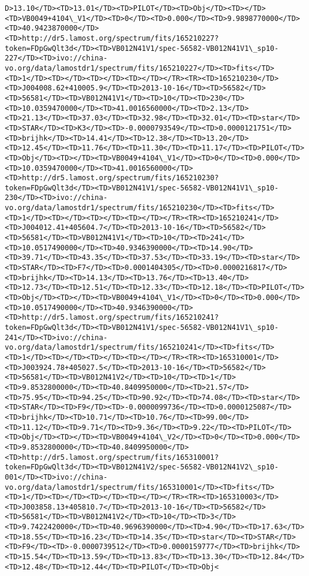 \documentclass[11pt]{article}
\begin{document}
\begin{Verbatim}[commandchars=\\\{\}]
D>13.10</TD><TD>13.01</TD><TD>PILOT</TD><TD>Obj</TD><TD></TD><TD>VB0049+4104\_V1</TD><TD>0</TD><TD>0.000</TD><TD>9.9898770000</TD><TD>40.9423870000</TD><TD>http://dr5.lamost.org/spectrum/fits/165210227?token=FDpGwQlt3d</TD><TD>VB012N41V1/spec-56582-VB012N41V1\_sp10-227</TD><TD>ivo://china-vo.org/data/lamostdr1/spectrum/fits/165210227</TD><TD>fits</TD><TD>1</TD><TD></TD><TD></TD><TD></TD></TR><TR><TD>165210230</TD><TD>J004008.62+410005.9</TD><TD>2013-10-16</TD><TD>56582</TD><TD>56581</TD><TD>VB012N41V1</TD><TD>10</TD><TD>230</TD><TD>10.0359470000</TD><TD>41.0016560000</TD><TD>2.13</TD><TD>21.13</TD><TD>37.03</TD><TD>32.98</TD><TD>32.01</TD><TD>star</TD><TD>STAR</TD><TD>K3</TD><TD>-0.0000793549</TD><TD>0.0000121751</TD><TD>brijhk</TD><TD>14.41</TD><TD>12.38</TD><TD>13.20</TD><TD>12.45</TD><TD>11.76</TD><TD>11.30</TD><TD>11.17</TD><TD>PILOT</TD><TD>Obj</TD><TD></TD><TD>VB0049+4104\_V1</TD><TD>0</TD><TD>0.000</TD><TD>10.0359470000</TD><TD>41.0016560000</TD><TD>http://dr5.lamost.org/spectrum/fits/165210230?token=FDpGwQlt3d</TD><TD>VB012N41V1/spec-56582-VB012N41V1\_sp10-230</TD><TD>ivo://china-vo.org/data/lamostdr1/spectrum/fits/165210230</TD><TD>fits</TD><TD>1</TD><TD></TD><TD></TD><TD></TD></TR><TR><TD>165210241</TD><TD>J004012.41+405604.7</TD><TD>2013-10-16</TD><TD>56582</TD><TD>56581</TD><TD>VB012N41V1</TD><TD>10</TD><TD>241</TD><TD>10.0517490000</TD><TD>40.9346390000</TD><TD>14.90</TD><TD>39.71</TD><TD>43.35</TD><TD>37.53</TD><TD>33.19</TD><TD>star</TD><TD>STAR</TD><TD>F7</TD><TD>0.0001404305</TD><TD>0.0000216817</TD><TD>brijhk</TD><TD>14.13</TD><TD>13.76</TD><TD>13.40</TD><TD>12.73</TD><TD>12.51</TD><TD>12.33</TD><TD>12.18</TD><TD>PILOT</TD><TD>Obj</TD><TD></TD><TD>VB0049+4104\_V1</TD><TD>0</TD><TD>0.000</TD><TD>10.0517490000</TD><TD>40.9346390000</TD><TD>http://dr5.lamost.org/spectrum/fits/165210241?token=FDpGwQlt3d</TD><TD>VB012N41V1/spec-56582-VB012N41V1\_sp10-241</TD><TD>ivo://china-vo.org/data/lamostdr1/spectrum/fits/165210241</TD><TD>fits</TD><TD>1</TD><TD></TD><TD></TD><TD></TD></TR><TR><TD>165310001</TD><TD>J003924.78+405027.5</TD><TD>2013-10-16</TD><TD>56582</TD><TD>56581</TD><TD>VB012N41V2</TD><TD>10</TD><TD>1</TD><TD>9.8532800000</TD><TD>40.8409950000</TD><TD>21.57</TD><TD>75.95</TD><TD>94.25</TD><TD>90.92</TD><TD>74.08</TD><TD>star</TD><TD>STAR</TD><TD>F9</TD><TD>-0.0000099736</TD><TD>0.0000125087</TD><TD>brijhk</TD><TD>10.71</TD><TD>10.76</TD><TD>99.00</TD><TD>11.12</TD><TD>9.71</TD><TD>9.36</TD><TD>9.22</TD><TD>PILOT</TD><TD>Obj</TD><TD></TD><TD>VB0049+4104\_V2</TD><TD>0</TD><TD>0.000</TD><TD>9.8532800000</TD><TD>40.8409950000</TD><TD>http://dr5.lamost.org/spectrum/fits/165310001?token=FDpGwQlt3d</TD><TD>VB012N41V2/spec-56582-VB012N41V2\_sp10-001</TD><TD>ivo://china-vo.org/data/lamostdr1/spectrum/fits/165310001</TD><TD>fits</TD><TD>1</TD><TD></TD><TD></TD><TD></TD></TR><TR><TD>165310003</TD><TD>J003858.13+405810.7</TD><TD>2013-10-16</TD><TD>56582</TD><TD>56581</TD><TD>VB012N41V2</TD><TD>10</TD><TD>3</TD><TD>9.7422420000</TD><TD>40.9696390000</TD><TD>4.90</TD><TD>17.63</TD><TD>18.55</TD><TD>16.23</TD><TD>14.35</TD><TD>star</TD><TD>STAR</TD><TD>F9</TD><TD>-0.0000739512</TD><TD>0.0000159777</TD><TD>brijhk</TD><TD>15.54</TD><TD>13.59</TD><TD>13.83</TD><TD>13.30</TD><TD>12.84</TD><TD>12.48</TD><TD>12.44</TD><TD>PILOT</TD><TD>Obj<
\end{Verbatim}
\end{document}

